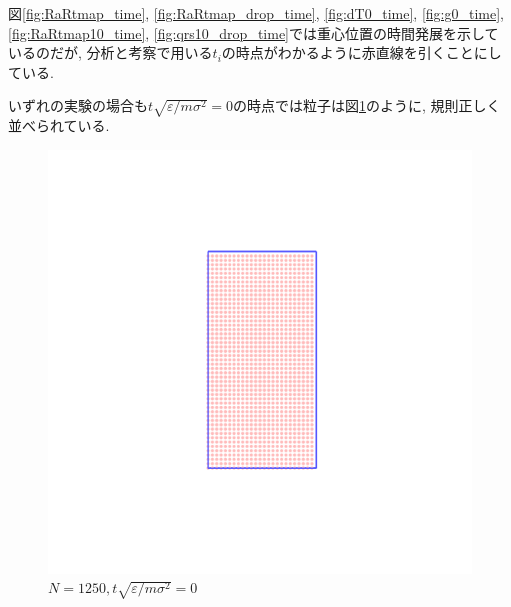図\ref{fig:RaRtmap_time}, \ref{fig:RaRtmap_drop_time}, \ref{fig:dT0_time}, \ref{fig:g0_time}, \ref{fig:RaRtmap10_time}, \ref{fig:qrs10_drop_time}では重心位置の時間発展を示しているのだが, 分析と考察で用いる$t_i$の時点がわかるように赤直線を引くことにしている.

いずれの実験の場合も$t\sqrt{\varepsilon/m{\sigma}^2}=0$の時点では粒子は図\ref{fig:linedUp}のように, 規則正しく並べられている.

\begin{figure}[H]
  \centering
  \includegraphics[scale=0.2]{image/initial1250.png}
  \caption{$N=1250, t\sqrt{\varepsilon/m{\sigma}^2}=0$}
  \label{fig:linedUp}
\end{figure}





